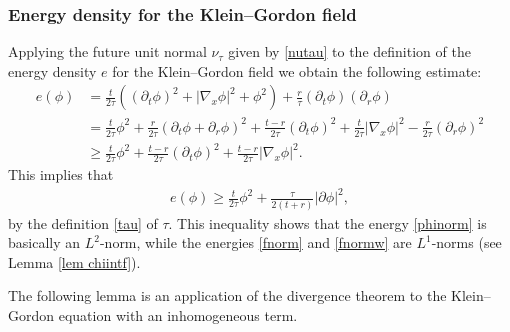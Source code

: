 \documentclass{article}
\begin{document}
\subsubsection{Energy density for the Klein--Gordon field} \label{sec basicphi}
Applying the future unit normal $ \nu_\tau $ given by \eqref{nutau} to the definition of the energy density $ e $ for the Klein--Gordon field we obtain the following estimate:
\begin{align*}
e ( \phi ) & = \frac{ t }{ 2 \tau } \left( (\partial_t \phi )^2 + | \nabla_x \phi |^2 + \phi^2 \right) + \frac{ r }{ \tau } ( \partial_t \phi ) ( \partial_r \phi ) \\
& = \frac{ t }{ 2 \tau } \phi^2 + \frac{ r }{ 2 \tau } ( \partial_t \phi + \partial_r \phi )^2 + \frac{ t - r }{ 2 \tau } ( \partial_t \phi )^2 + \frac{ t }{ 2 \tau } | \nabla_x \phi |^2 - \frac{ r }{ 2 \tau } ( \partial_r \phi )^2 \\
& \geq \frac{ t }{ 2 \tau } \phi^2 + \frac{ t - r }{ 2 \tau } ( \partial_t \phi )^2 + \frac{ t - r }{ 2 \tau } | \nabla_x \phi |^2 .
\end{align*}
This implies that
\begin{align}
e ( \phi ) \geq \frac{ t }{ 2 \tau } \phi^2 + \frac{ \tau }{ 2 ( t + r ) } | \partial \phi |^2 , \label{chiphiphi}
\end{align}
by the definition \eqref{tau} of $ \tau $. This inequality shows that the energy \eqref{phinorm} is basically an $ L^2 $-norm, while the energies \eqref{fnorm} and \eqref{fnormw} are $ L^1 $-norms (see Lemma \ref{lem chiintf}).


The following lemma is an application of the divergence theorem to the Klein--Gordon equation with an inhomogeneous term.
\end{document}
